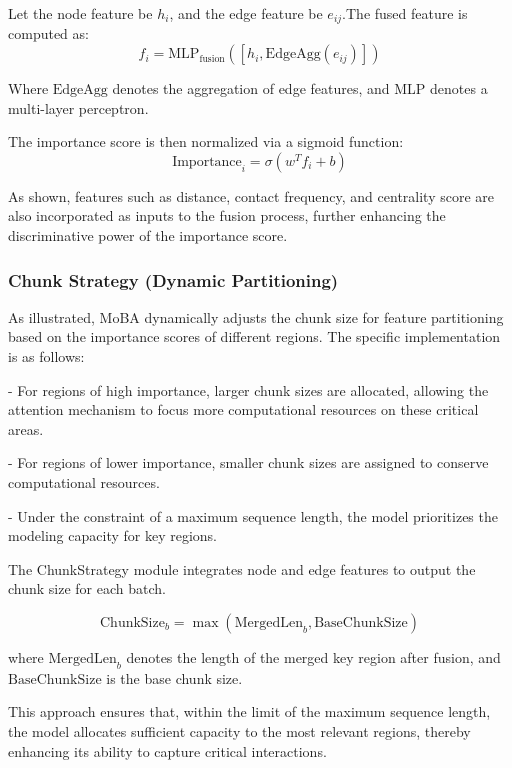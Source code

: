 \documentclass[lettersize,journal]{IEEEtran}
\begin{document}
Let the node feature be $h_i$, and the edge feature be $e_{ij}$.The fused feature is computed as:
\begin{equation}
f_i = \text{MLP}_{\text{fusion}}\left(\left[h_i, \text{EdgeAgg}(e_{ij})\right]\right)
\end{equation}

Where $\text{EdgeAgg}$ denotes the aggregation of edge features, and MLP
denotes a multi-layer perceptron.

The importance score is then normalized via a sigmoid function:
\begin{equation}
\text{Importance}_i = \sigma(w^T f_i + b)
\end{equation}

As shown, features such as distance, contact frequency, and centrality
score are also incorporated as inputs to the fusion process, further
enhancing the discriminative power of the importance score.
\subsubsection{Chunk Strategy (Dynamic Partitioning)}
As illustrated, MoBA dynamically adjusts the chunk size for feature
partitioning based on the importance scores of different regions. The
specific implementation is as follows:

- For regions of high importance, larger chunk sizes are allocated,
  allowing the attention mechanism to focus more computational resources
  on these critical areas.
  
- For regions of lower importance, smaller chunk sizes are assigned to
  conserve computational resources.
  
- Under the constraint of a maximum sequence length, the model
  prioritizes the modeling capacity for key regions.

The ChunkStrategy module integrates node and edge features to output
  the chunk size for each batch.

\begin{equation}
\text{ChunkSize}_b = \max(\text{MergedLen}_b, \text{BaseChunkSize})
\end{equation}

where $\text{MergedLen}_b$ denotes the length of the merged key region
after fusion, and $\text{BaseChunkSize}$ is the base chunk size.

This approach ensures that, within the limit of the maximum sequence
length, the model allocates sufficient capacity to the most relevant
regions, thereby enhancing its ability to capture critical interactions.
\end{document}
